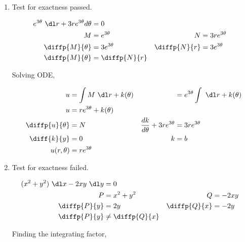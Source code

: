 \begin{enumerate}
    \item Test for exactness passed.

          \begin{align}
              e^{3\theta}\ \dl r + 3r e^{3\theta} d\theta & = 0                                             \\
              M                                           & = e^{3\theta}  & N            & = 3re^{3\theta} \\
              \diffp{M}{\theta}                           & = 3e^{3\theta} & \diffp{N}{r} & = 3e^{3\theta}  \\
              \diffp{M}{\theta}                           & = \diffp{N}{r}
          \end{align}

          Solving ODE,

          \begin{align}
              u                 & = \int M\ \dl r + k(\theta) &                                    & = e^{3\theta} \int\ \dl r + k(\theta) \\
              u                 & = re^{3\theta} + k(\theta)                                                                               \\
              \diffp{u}{\theta} & = N                         & \frac{dk}{d\theta} + 3re^{3\theta} & = 3re^{3\theta}                       \\
              \diff{k}{y}       & = 0                         & k                                  & = b                                   \\
              u(r, \theta)      & = re^{3\theta}
          \end{align}


    \item Test for exactness failed.

          \begin{align}
              (x^{2} + y^{2}) \ \dl x - 2xy \ \dl y & = 0                                       \\
              P                                     & = x^{2} + y^{2}   & Q            & = -2xy \\
              \diffp{P}{y}                          & = 2y              & \diffp{Q}{x} & = -2y  \\
              \diffp{P}{y}                          & \neq \diffp{Q}{x}
          \end{align}

          Finding the integrating factor,


\end{enumerate}
